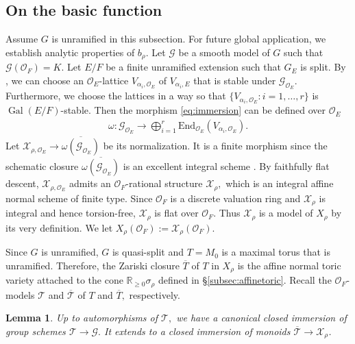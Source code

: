 \documentclass[10pt]{amsart}
\newtheorem{lemma}[theorem]{Lemma}
\theoremstyle{definition}
\numberwithin{equation}{section}
\DeclareMathOperator{\Gal}{\mathrm{Gal}}
\numberwithin{equation}{subsection}
\newcommand{\RR}{\mathbb{R}}
\begin{document}
\subsection{On the basic function}
Assume $G$ is unramified in this subsection. For future global application, we establish analytic properties of $b_\rho$. Let $\mathcal{G}$ be a smooth model of $G$ such that $\mathcal{G}(\mathcal{O}_F)=K$.  Let $E/F$ be a finite unramified extension such that $G_E$ is split. By \cite[I.10.4]{Jantzen:Reps}, we can choose an $\mathcal{O}_E$-lattice $V_{\alpha_i,\mathcal{O}_{E}}$ of $V_{\alpha_i,E}$ that is stable under $\mathcal{G}_{\mathcal{O}_E}$. Furthermore, we choose the lattices in a way so that $\{V_{\alpha_i,\mathcal{O}_{E}}: i=1,\ldots,r\}$ is $\Gal(E/F)$-stable. Then the morphism \eqref{eq:immersion} can be defined over $\mathcal{O}_E$ 
\begin{align*}
    \omega:\mathcal{G}_{\mathcal{O}_E}\longrightarrow \bigoplus_{i=1}^r\mathrm{End}_{\mathcal{O}_E}(V_{\alpha_i,\mathcal{O}_E}).
\end{align*}
Let $\mathcal{X}_{\rho,\mathcal{O}_E}\longrightarrow\overline{\omega(\mathcal{G}_{\mathcal{O}_E})}$ be its normalization. It is a finite morphism since the schematic closure $\overline{\omega(\mathcal{G}_{\mathcal{O}_E})}$ is an excellent integral scheme \cite[\href{https://stacks.math.columbia.edu/tag/07QW}{Tag 07QW}]{stacks-project}. By faithfully flat descent, $\mathcal{X}_{\rho,\mathcal{O}_E}$ admits an $\mathcal{O}_F$-rational structure $\mathcal{X}_\rho,$ which is an integral affine normal scheme of finite type.  Since $\mathcal{O}_F$ is a discrete valuation ring and $\mathcal{X}_\rho$ is integral and hence torsion-free, $\mathcal{X}_\rho$ is flat over $\mathcal{O}_F$. Thus $\mathcal{X}_\rho$ is a model of $X_\rho$ by its very definition. We let $X_\rho(\mathcal{O}_F):=\mathcal{X}_\rho(\mathcal{O}_F).$ 

Since $G$ is unramified, $G$ is quasi-split and $T=M_0$ is a maximal torus that is unramified. Therefore, the Zariski closure $\overline{T}$ of $T$ in $X_\rho$ is the affine normal toric variety attached to the cone $\RR_{\ge 0}\sigma_\rho$ defined in \S \ref{subsec:affinetoric}. Recall the $\mathcal{O}_F$-models $\mathcal{T}$ and $\overline{\mathcal{T}}$ of $T$ and $\overline{T},$ respectively.


\begin{lemma}\label{lem:modelmap}
 Up to automorphisms of $\mathcal{T},$ we have a canonical closed immersion of group schemes $\mathcal{T}\longrightarrow \mathcal{G}.$ It extends to a closed immersion of monoids $\overline{\mathcal{T}}\longrightarrow\mathcal{X}_\rho$.
\end{lemma}
\end{document}

